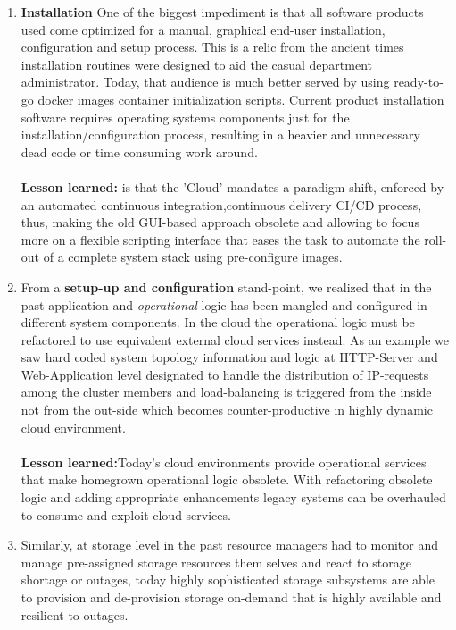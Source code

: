 \documentclass[EPiC]{easychair} %
\begin{document}
    \begin{enumerate}
        \item \textbf{Installation} One of the biggest impediment is that all software products used come optimized for a manual, graphical end-user installation, configuration and setup process. This is a relic from the ancient times installation routines were designed to aid the casual department administrator. Today, that audience is much better served by using ready-to-go docker images container initialization scripts. Current product installation software requires operating systems components just for the installation/configuration process, resulting in a heavier and unnecessary dead code or time consuming work around. \\\\
        \textbf{Lesson learned:} is that the 'Cloud' mandates a paradigm shift, enforced by an automated continuous integration,continuous delivery CI/CD process, thus, making the old GUI-based approach obsolete and allowing to focus more on a flexible scripting interface that eases the task to automate the roll-out of a complete system stack using pre-configure images.
        \item From a \textbf{setup-up and configuration} stand-point, we realized that in the past application and \textit{operational} logic has been mangled and configured in different system components. In the cloud the operational logic must be refactored to use equivalent external cloud services instead. As an example we saw hard coded system topology information and logic at HTTP-Server and Web-Application level designated to handle the distribution of IP-requests among the cluster members and load-balancing is triggered from the inside not from the out-side which becomes counter-productive in highly dynamic cloud environment. \\\\
        \textbf{Lesson learned:}Today's cloud environments provide operational services that make homegrown operational logic obsolete. With refactoring obsolete logic and adding appropriate enhancements legacy systems can be overhauled to consume and exploit cloud services. 
        \item{}Similarly, at storage level in the past resource managers had to monitor and manage pre-assigned storage resources them selves and react to storage shortage or outages, today highly sophisticated storage subsystems are able to provision and de-provision storage on-demand that is highly available and resilient to outages.  \\\\

\end{enumerate}
\end{document}
